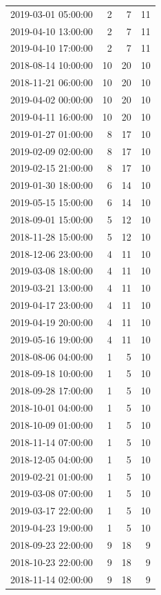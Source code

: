 \begin{tabular}{lrrr}
2019-03-01 05:00:00 & 2 & 7 & 11 \\
2019-04-10 13:00:00 & 2 & 7 & 11 \\
2019-04-10 17:00:00 & 2 & 7 & 11 \\
2018-08-14 10:00:00 & 10 & 20 & 10 \\
2018-11-21 06:00:00 & 10 & 20 & 10 \\
2019-04-02 00:00:00 & 10 & 20 & 10 \\
2019-04-11 16:00:00 & 10 & 20 & 10 \\
2019-01-27 01:00:00 & 8 & 17 & 10 \\
2019-02-09 02:00:00 & 8 & 17 & 10 \\
2019-02-15 21:00:00 & 8 & 17 & 10 \\
2019-01-30 18:00:00 & 6 & 14 & 10 \\
2019-05-15 15:00:00 & 6 & 14 & 10 \\
2018-09-01 15:00:00 & 5 & 12 & 10 \\
2018-11-28 15:00:00 & 5 & 12 & 10 \\
2018-12-06 23:00:00 & 4 & 11 & 10 \\
2019-03-08 18:00:00 & 4 & 11 & 10 \\
2019-03-21 13:00:00 & 4 & 11 & 10 \\
2019-04-17 23:00:00 & 4 & 11 & 10 \\
2019-04-19 20:00:00 & 4 & 11 & 10 \\
2019-05-16 19:00:00 & 4 & 11 & 10 \\
2018-08-06 04:00:00 & 1 & 5 & 10 \\
2018-09-18 10:00:00 & 1 & 5 & 10 \\
2018-09-28 17:00:00 & 1 & 5 & 10 \\
2018-10-01 04:00:00 & 1 & 5 & 10 \\
2018-10-09 01:00:00 & 1 & 5 & 10 \\
2018-11-14 07:00:00 & 1 & 5 & 10 \\
2018-12-05 04:00:00 & 1 & 5 & 10 \\
2019-02-21 01:00:00 & 1 & 5 & 10 \\
2019-03-08 07:00:00 & 1 & 5 & 10 \\
2019-03-17 22:00:00 & 1 & 5 & 10 \\
2019-04-23 19:00:00 & 1 & 5 & 10 \\
2018-09-23 22:00:00 & 9 & 18 & 9 \\
2018-10-23 22:00:00 & 9 & 18 & 9 \\
2018-11-14 02:00:00 & 9 & 18 & 9 \\

\end{tabular}
